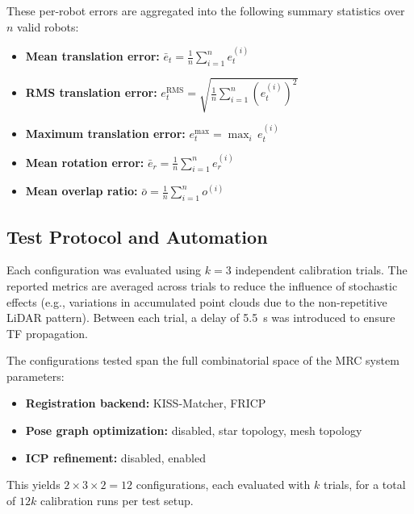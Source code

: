 These per-robot errors are aggregated into the following summary
statistics over $n$ valid robots:
\begin{itemize}
    \item \textbf{Mean translation error:}
          $\bar{e}_t = \frac{1}{n} \sum_{i=1}^{n} e_t^{(i)}$
    \item \textbf{RMS translation error:}
          $e_t^\mathrm{RMS} = \sqrt{\frac{1}{n} \sum_{i=1}^{n}
          (e_t^{(i)})^2}$
    \item \textbf{Maximum translation error:}
          $e_t^\mathrm{max} = \max_i \, e_t^{(i)}$
    \item \textbf{Mean rotation error:}
          $\bar{e}_r = \frac{1}{n} \sum_{i=1}^{n} e_r^{(i)}$
    \item \textbf{Mean overlap ratio:}
          $\bar{o} = \frac{1}{n} \sum_{i=1}^{n} o^{(i)}$
\end{itemize}

\subsection{Test Protocol and Automation}
\label{sec:test_protocol}

Each configuration was evaluated using $k = 3$ independent calibration
trials.
The reported metrics are averaged across trials to reduce the influence
of stochastic effects (e.g., variations in accumulated point clouds
due to the non-repetitive LiDAR pattern).
Between each trial, a delay of \SI{5.5}{\second} was introduced to
ensure TF propagation.

The configurations tested span the full combinatorial space of the
MRC system parameters:
\begin{itemize}
    \item \textbf{Registration backend:} KISS-Matcher, FRICP
    \item \textbf{Pose graph optimization:} disabled, star topology,
          mesh topology
    \item \textbf{ICP refinement:} disabled, enabled
\end{itemize}
This yields $2 \times 3 \times 2 = 12$ configurations, each
evaluated with $k$ trials, for a total of $12k$ calibration runs
per test setup.

